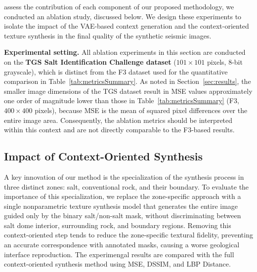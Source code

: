\documentclass{ieeeaccess}
\begin{document}
 assess the contribution of each component of our proposed methodology, we conducted an ablation study, discussed below. We design these experiments to isolate the impact of the VAE-based context generation and the context-oriented texture synthesis in the final quality of the synthetic seismic images.

\noindent\textbf{Experimental setting.} All ablation experiments in this section are conducted on the \textbf{TGS Salt Identification Challenge dataset} ($101 \times 101$ pixels, 8-bit grayscale), which is distinct from the F3 dataset used for the quantitative comparison in Table~\ref{tab:metricsSummary}. As noted in Section~\ref{sec:results}, the smaller image dimensions of the TGS dataset result in MSE values approximately one order of magnitude lower than those in Table~\ref{tab:metricsSummary} (F3, $400 \times 400$ pixels), because MSE is the mean of squared pixel differences over the entire image area. Consequently, the ablation metrics should be interpreted within this context and are not directly comparable to the F3-based results.

\subsection{Impact of Context-Oriented Synthesis}

A key innovation of our method is the specialization of the synthesis process in three distinct zones: salt, conventional rock, and their boundary. To evaluate the importance of this specialization, we replace the zone-specific approach with a single nonparametric texture synthesis model that generates the entire image guided only by the binary salt/non-salt mask, without discriminating between salt dome interior, surrounding rock, and boundary regions. Removing this context-oriented step tends to reduce the zone-specific textural fidelity, preventing an accurate correspondence with annotated masks, causing a worse geological interface reproduction. The experimengal results are compared with the full context-oriented synthesis method using MSE, DSSIM, and LBP Distance.
\end{document}
